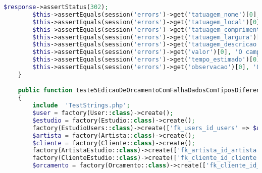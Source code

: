 \begin{lstlisting}[language=PHP, caption= Scripts de teste de Edição de Orçamentos, nolol,
label={code:EdicaoDeOrcamentoTest}]
        $response->assertStatus(302);
        $this->assertEquals(session('errors')->get('tatuagem_nome')[0], 'O campo tatuagem nome não pode ser superior a 60 caracteres.');
        $this->assertEquals(session('errors')->get('tatuagem_local')[0], 'O campo tatuagem local não pode ser superior a 60 caracteres.');
        $this->assertEquals(session('errors')->get('tatuagem_comprimento')[0], 'O campo tatuagem comprimento não pode ser superior a 200.');
        $this->assertEquals(session('errors')->get('tatuagem_largura')[0], 'O campo tatuagem largura não pode ser superior a 200.');
        $this->assertEquals(session('errors')->get('tatuagem_descricao')[0], 'O campo tatuagem descricao não pode ser superior a 255 caracteres.');
        $this->assertEquals(session('errors')->get('valor')[0], 'O campo valor tem um formato inválido.');
        $this->assertEquals(session('errors')->get('tempo_estimado')[0], 'O campo tempo estimado tem um formato inválido.');
        $this->assertEquals(session('errors')->get('observacao')[0], 'O campo observacao não pode ser superior a 255 caracteres.');
    }

    public function teste5EdicaoDeOrcamentoComFalhaDadosComTiposDiferentesDoSuportado()
    {
        include  'TestStrings.php';
        $user = factory(User::class)->create();
        $estudio = factory(Estudio::class)->create();
        factory(EstudioUsers::class)->create(['fk_users_id_users' => $user->id, 'fk_estudio_id_estudio' => $estudio->id_estudio]);
        $artista = factory(Artista::class)->create();
        $cliente = factory(Cliente::class)->create();
        factory(ArtistaEstudio::class)->create(['fk_artista_id_artista' => $artista->id_artista, 'fk_estudio_id_estudio' => $estudio->id_estudio]);
        factory(ClienteEstudio::class)->create(['fk_cliente_id_cliente' => $cliente->id_cliente, 'fk_estudio_id_estudio' => $estudio->id_estudio]);
        $orcamento = factory(Orcamento::class)->create(['fk_cliente_id_cliente' => $cliente->id_cliente, 'fk_artista_id_artista' => $artista->id_artista, 'fk_estudio_id_estudio' => $estudio->id_estudio, 'fk_orcamento_status_id_orcamento_status' => 1]);


\end{lstlisting}
